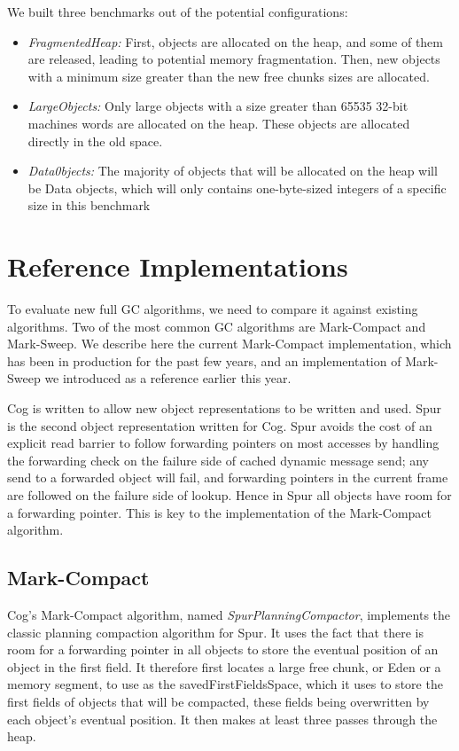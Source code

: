 \documentclass[10pt, sigplan]{acmart}
\begin{document}
We built three benchmarks out of the potential configurations:
\begin{itemize}
\item \emph{FragmentedHeap:} First, objects are allocated on the heap, and some of them are released, leading to potential memory fragmentation. Then, new objects with a minimum size greater than the new free chunks sizes are allocated.
\item \emph{LargeObjects:} Only large objects with a size greater than 65535 32-bit machines words are allocated on the heap. These objects are allocated directly in the old space.
\item \emph{Data0bjects:} The majority of objects that will be allocated on the heap will be Data objects, which will only contains one-byte-sized integers of a specific size in this benchmark  
\end{itemize}

\section{Reference Implementations} \label{sec:ref}

To evaluate new full GC algorithms, we need to compare it against existing algorithms. Two of the most common GC algorithms are Mark-Compact and Mark-Sweep. We describe here the current Mark-Compact implementation, which has been in production for the past few years, and an implementation of Mark-Sweep we introduced as a reference earlier this year.

Cog is written to allow new object representations to be written and used.  Spur \cite{SpurMirandaBera} is the second object representation written for Cog.  Spur avoids the cost of an explicit read barrier to follow forwarding pointers on most accesses by handling the forwarding check on the failure side of cached dynamic message send; any send to a forwarded object will fail, and forwarding pointers in the current frame are followed on the failure side of lookup.  Hence in Spur all objects have room for a forwarding pointer.  This is key to the implementation of the Mark-Compact algorithm. 

\subsection{Mark-Compact} \label{sec:refmc}


Cog's Mark-Compact algorithm, named \emph{SpurPlanningCompactor}, implements the classic planning compaction algorithm for Spur.  It uses the fact that there is room for a forwarding pointer in all objects to store the eventual position of an object in the first field. It therefore first locates a large free chunk, or Eden or a memory segment, to use as the savedFirstFieldsSpace, which it uses to store the first fields of objects that will be compacted, these fields being overwritten by each object's eventual position. It then makes at least three passes through the heap.
\end{document}
